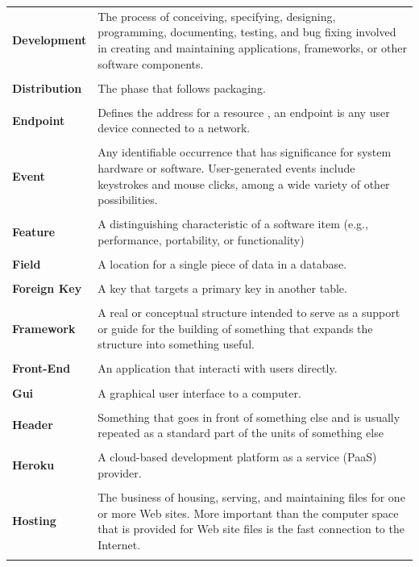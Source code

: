 \documentclass[a4paper,11pt,twoside]{report}
\theoremstyle{definition}
\begin{document}
\begin{longtable}{p{4cm} p{11cm}}
\textbf{Development} & The process of conceiving, specifying, designing, programming, documenting, testing, and bug fixing involved in creating and maintaining applications, frameworks, or other software components. \\ \\
\textbf{Distribution} & The phase that follows packaging.\\ \\
\textbf{Endpoint} & Defines the address for a resource , an endpoint is any user device connected to a network.\\ \\
\textbf{Event} & Any identifiable occurrence that has significance for system hardware or software. User-generated events include keystrokes and mouse clicks, among a wide variety of other possibilities.\\ \\
\textbf{Feature} & A distinguishing characteristic of a software item (e.g., performance, portability, or functionality)\\ \\
\textbf{Field} & A location for a single piece of data in a database.\\ \\
\textbf{Foreign Key} & A key that targets a primary key in another table.\\ \\
\textbf{Framework} & A real or conceptual structure intended to serve as a support or guide for the building of something that expands the structure into something useful.\\ \\
\textbf{Front-End} & An application that interacti with users directly.\\ \\
\textbf{Gui} & A graphical user interface to a computer.\\ \\
\textbf{Header} & Something that goes in front of something else and is usually repeated as a standard part of the units of something else\\ \\
\textbf{Heroku} & A cloud-based development platform as a service (PaaS) provider.\\ \\
\textbf{Hosting} & The business of housing, serving, and maintaining files for one or more Web sites. More important than the computer space that is provided for Web site files is the fast connection to the Internet. \\ \\

\end{longtable}
\end{document}
